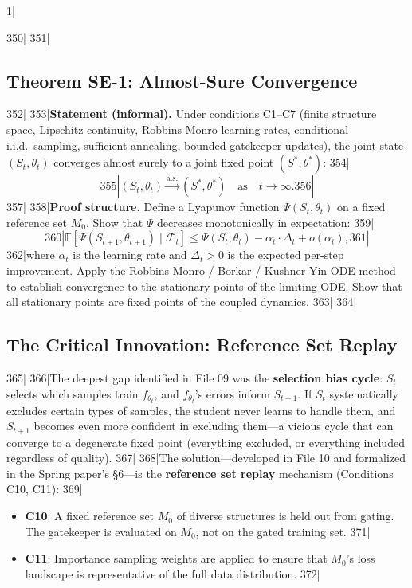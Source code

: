 1|\documentclass[12pt,a4paper]{article}
\begin{document}
350|
351|\subsection{Theorem SE-1: Almost-Sure Convergence}
352|
353|\textbf{Statement (informal).} Under conditions C1–C7 (finite structure space, Lipschitz continuity, Robbins-Monro learning rates, conditional i.i.d.\ sampling, sufficient annealing, bounded gatekeeper updates), the joint state $(S_t, \theta_t)$ converges almost surely to a joint fixed point $(S^*, \theta^*)$:
354|\[
355|(S_t, \theta_t) \xrightarrow{\text{a.s.}} (S^*, \theta^*) \quad \text{as} \quad t \to \infty.
356|\]
357|
358|\textbf{Proof structure.} Define a Lyapunov function $\Psi(S_t, \theta_t)$ on a fixed reference set $M_0$. Show that $\Psi$ decreases monotonically in expectation:
359|\[
360|\mathbb{E}[\Psi(S_{t+1}, \theta_{t+1}) \mid \mathcal{F}_t] \leq \Psi(S_t, \theta_t) - \alpha_t \cdot \Delta_t + o(\alpha_t),
361|\]
362|where $\alpha_t$ is the learning rate and $\Delta_t > 0$ is the expected per-step improvement. Apply the Robbins-Monro / Borkar / Kushner-Yin ODE method to establish convergence to the stationary points of the limiting ODE. Show that all stationary points are fixed points of the coupled dynamics.
363|
364|\subsection{The Critical Innovation: Reference Set Replay}
365|
366|The deepest gap identified in File 09 was the \textbf{selection bias cycle}: $S_t$ selects which samples train $f_{\theta_t}$, and $f_{\theta_t}$'s errors inform $S_{t+1}$. If $S_t$ systematically excludes certain types of samples, the student never learns to handle them, and $S_{t+1}$ becomes even more confident in excluding them—a vicious cycle that can converge to a degenerate fixed point (everything excluded, or everything included regardless of quality).
367|
368|The solution—developed in File 10 and formalized in the Spring paper's \S6—is the \textbf{reference set replay} mechanism (Conditions C10, C11):
369|\begin{itemize}
370|\item \textbf{C10}: A fixed reference set $M_0$ of diverse structures is held out from gating. The gatekeeper is evaluated on $M_0$, not on the gated training set.
371|\item \textbf{C11}: Importance sampling weights are applied to ensure that $M_0$'s loss landscape is representative of the full data distribution.
372|\end{itemize}
\end{document}
